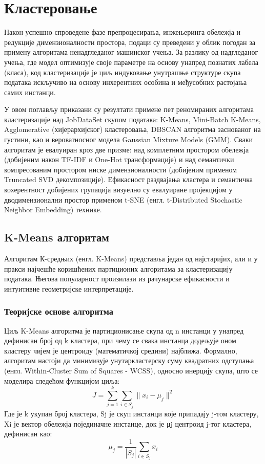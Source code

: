 \documentclass[a4paper,12pt]{report}
\begin{document}
	\chapter{Кластеровање}

	Након успешно спроведене фазе препроцесирања, инжењеринга обележја и редукције димензионалности простора, подаци су преведени у облик погодан за примену алгоритама ненадгледаног машинског учења. За разлику од надгледаног учења, где модел оптимизује своје параметре на основу унапред познатих лабела (класа), код кластеризације је циљ индуковање унутрашње структуре скупа података искључиво на основу инхерентних особина и међусобних растојања самих инстанци.
	
	У овом поглављу приказани су резултати примене пет реномираних алгоритама кластеризације над JobDataSet скупом података: K-Means, Mini-Batch K-Means, Agglomerative (хијерархијског) кластеровања, DBSCAN алгоритма заснованог на густини, као и вероватносног модела Gaussian Mixture Models (GMM). Сваки алгоритам је евалуиран кроз две призме: над комплетним простором обележја (добијеним након TF-IDF и One-Hot трансформације) и над семантички компресованим простором ниске димензионалности (добијеним применом Truncated SVD декомпозиције). Ефикасност раздвајања кластера и семантичка кохерентност добијених групација визуелно су евалуиране пројекцијом у дводимензионални простор применом t-SNE (енгл. t-Distributed Stochastic Neighbor Embedding) технике.
	
	\section{K-Means алгоритам}
	Алгоритам К-средњих (енгл. K-Means) представља један од најстаријих, али и у пракси најчешће коришћених партиционих алгоритама за кластеризацију података. Његова популарност произилази из рачунарске ефикасности и интуитивне геометријске интерпретације.

	\subsection{Теоријске основе алгоритма}
	Циљ K-Means алгоритма је партиционисање скупа од n инстанци у унапред дефинисан број од k кластера, при чему се свака инстанца додељује оном кластеру чијем је центроиду (математичкој средини) најближа. Формално, алгоритам настоји да минимизује унутаркластерску суму квадратних одступања (енгл. Within-Cluster Sum of Squares - WCSS), односно инерцију скупа, што се моделира следећом функцијом циља: 
	$$ J = \sum_{j=1}^{k} \sum_{i \in S_j} \|x_i - \mu_j\|^2 $$
	Где је k укупан број кластера, Sj​ је скуп инстанци које припадају j-том кластеру, Xi​ је вектор обележја појединачне инстанце, док је μj​ центроид j-тог кластера, дефинисан као:
	$$ \mu_j = \frac{1}{|S_j|} \sum_{i \in S_j} x_i $$
	
\end{document}
